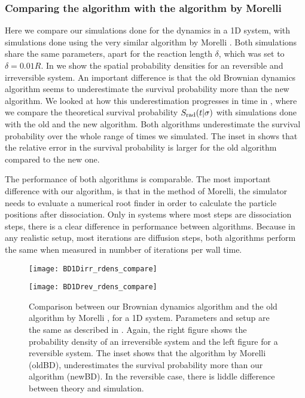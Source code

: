 \subsubsection{Comparing the algorithm with the algorithm by Morelli}
Here we compare our simulations done for the dynamics in a 1D system, with simulations done using the very similar algorithm by Morelli \cite{Morelli2008a}. Both simulations share the same parameters, apart for the reaction length $\delta$, which was set to $\delta=0.01R$. In  we show the spatial probability densities for an reversible and irreversible system. An important difference is that the old Brownian dynamics algorithm seems to underestimate the survival probability more than the new algorithm. We looked at how this underestimation progresses in time in , where we compare the theoretical survival probability $S_{\rm rad}(t|\sigma)$ with simulations done with the old and the new algorithm. Both algorithms underestimate the survival probability over the whole range of times we simulated. The inset in  shows that the relative error in the survival probability is larger for the old algorithm compared to the new one.

The performance of both algorithms is comparable. The most important difference with our algorithm, is that in the method of Morelli, the simulator needs to evaluate a numerical root finder in order to calculate the particle positions after dissociation. Only in systems where most steps are dissociation steps, there is a clear difference in performance between algorithms. Because in any realistic setup, most iterations are diffusion steps, both algorithms perform the same when measured in numbber of iterations per wall time.  

\begin{figure}[hb]
\begin{minipage}[ht]{.5\linewidth}
\centering
\texttt{[image: BD1Dirr\_rdens\_compare]}
\end{minipage}
\begin{minipage}[ht]{.5\linewidth}
\centering
\texttt{[image: BD1Drev\_rdens\_compare]}
\end{minipage}
\caption{ Comparison between our Brownian dynamics algorithm and the old algorithm by Morelli \cite{Morelli2008a}, for a 1D system. Parameters and setup are the same as described in . Again, the right figure shows the probability density of an irreversible system and the left figure for a reversible system. The inset shows that the algorithm by Morelli (oldBD), underestimates the survival probability more than our algorithm (newBD). In the reversible case, there is liddle difference between theory and simulation.}
\end{figure}

